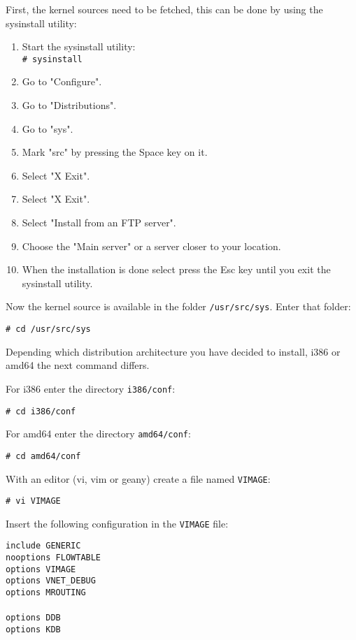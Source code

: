 First, the kernel sources need to be fetched, this can be done by using the
sysinstall utility:
\begin{enumerate}
\item Start the sysinstall utility:\\
\texttt{\# sysinstall}
\item Go to "Configure".
\item Go to "Distributions".
\item Go to "sys".
\item Mark "src" by pressing the Space key on it.
\item Select "X Exit".
\item Select "X Exit".
\item Select "Install from an FTP server".
\item Choose the "Main server" or a server closer to your location.
\item When the installation is done select press the Esc key until you exit the
sysinstall utility.
\end{enumerate}

Now the kernel source is available in the folder \texttt{/usr/src/sys}. Enter
that folder:

\texttt{\# cd /usr/src/sys}

Depending which distribution architecture you have decided to install, i386 or
amd64 the next command differs.

For i386 enter the directory \texttt{i386/conf}:

\texttt{\# cd i386/conf}

For amd64 enter the directory \texttt{amd64/conf}:

\texttt{\# cd amd64/conf}

With an editor (vi, vim or geany) create a file named \texttt{VIMAGE}:

\texttt{\# vi VIMAGE}

Insert the following configuration in the \texttt{VIMAGE} file:

\texttt{include	GENERIC \\
nooptions   FLOWTABLE \\
options	    VIMAGE \\
options	    VNET\_DEBUG \\
options	    MROUTING \\
 \\
options	    DDB \\
options	    KDB \\
}

